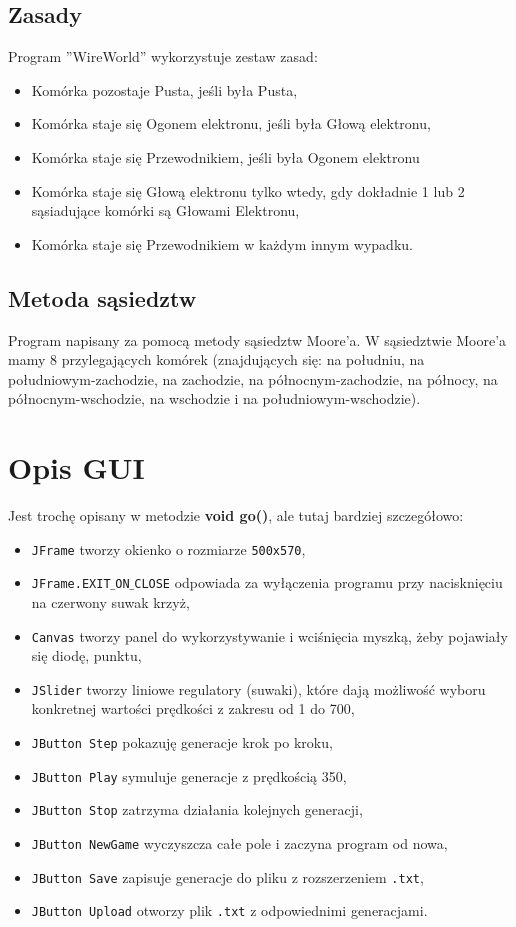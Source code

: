 \documentclass[a4paper, 12pt]{article}
\begin{document}
		\subsection{Zasady}
			\hspace*{1cm} Program ''WireWorld'' wykorzystuje zestaw zasad:
		\begin{itemize}
			\item Komórka pozostaje Pusta, jeśli była Pusta,
			\item Komórka staje się Ogonem elektronu, jeśli była Głową elektronu,
			\item Komórka staje się Przewodnikiem, jeśli była Ogonem elektronu
			\item Komórka staje się Głową elektronu tylko wtedy, gdy dokładnie 1 lub 2 sąsiadujące komórki są Głowami Elektronu,
			\item Komórka staje się Przewodnikiem w każdym innym wypadku.
		\end{itemize}			
		\subsection{Metoda sąsiedztw}			 
			 \hspace*{0,5cm}Program napisany za pomocą metody sąsiedztw Moore'a. W sąsiedztwie Moore'a mamy 8 przylegających komórek (znajdujących się: na południu, na południowym-zachodzie, na zachodzie, na północnym-zachodzie, na północy, na północnym-wschodzie, na wschodzie i na południowym-wschodzie). 
\newpage	
	\section{Opis GUI}
			\hspace*{1cm} Jest trochę opisany w metodzie \textbf{void go()}, ale tutaj bardziej szczegółowo:
		\begin{itemize}
			\item \texttt{JFrame} tworzy okienko o rozmiarze \texttt{500x570},
			\item \texttt{JFrame.EXIT$\_$ON$\_$CLOSE} odpowiada za wyłączenia programu przy nacisknięciu na czerwony suwak krzyż,
			\item \texttt{Canvas} tworzy panel do wykorzystywanie i wciśnięcia myszką, żeby pojawiały się diodę, punktu,
			\item \texttt{JSlider} tworzy liniowe regulatory (suwaki), które dają możliwość wyboru konkretnej wartości prędkości z zakresu od 1 do 700,
			\item \texttt{JButton Step} pokazuję generacje krok po kroku,
			\item \texttt{JButton Play} symuluje generacje z prędkością 350,
			\item \texttt{JButton Stop} zatrzyma działania kolejnych generacji,
			\item \texttt{JButton NewGame} wyczyszcza całe pole i zaczyna program od nowa,
			\item \texttt{JButton Save} zapisuje generacje do pliku z rozszerzeniem \texttt{.txt},
			\item \texttt{JButton Upload} otworzy plik \texttt{.txt} z odpowiednimi generacjami.
		\end{itemize}
		
\end{document}

